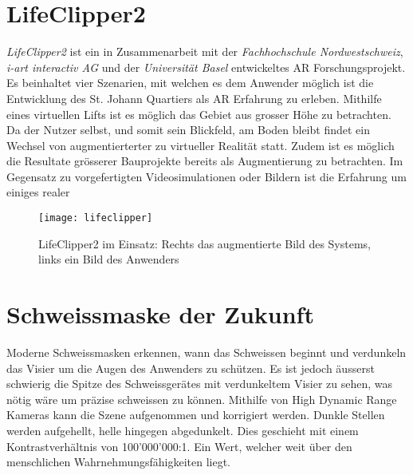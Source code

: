 \section{LifeClipper2}\label{s.clipper}
\textit{LifeClipper2} ist ein in Zusammenarbeit mit der \textit{Fachhochschule Nordwestschweiz}, \textit{i-art interactiv AG} und der \textit{Universität Basel} entwickeltes AR Forschungsprojekt. Es beinhaltet vier Szenarien, mit welchen es dem Anwender möglich ist die Entwicklung des St. Johann Quartiers als AR Erfahrung zu erleben. Mithilfe eines virtuellen Lifts ist es möglich das Gebiet aus grosser Höhe zu betrachten. Da der Nutzer selbst, und somit sein Blickfeld, am Boden bleibt findet ein Wechsel von augmentierterter zu virtueller Realität statt. Zudem ist es möglich die Resultate grösserer Bauprojekte bereits als Augmentierung zu betrachten. Im Gegensatz zu vorgefertigten Videosimulationen oder Bildern ist die Erfahrung um einiges realer \cite[S.~172~ff.]{website:lifeclipper}\\[6pt]

\begin{figure}[ht]
	\vspace{-15pt}
	\begin{center}
		\texttt{[image: lifeclipper]}
	\end{center}
	\vspace{-15pt}
	\caption[LifeClipper2 im Einsatz]{LifeClipper2 im Einsatz: Rechts das augmentierte Bild des Systems, links ein Bild des Anwenders}\label{lifeclipper}
	\vspace{-10pt}
\end{figure}


\section{Schweissmaske der Zukunft}\label{s.welding}
Moderne Schweissmasken erkennen, wann das Schweissen beginnt und verdunkeln das Visier um die Augen des Anwenders zu schützen. Es ist jedoch äusserst schwierig die Spitze des Schweissgerätes mit verdunkeltem Visier zu sehen, was nötig wäre um präzise schweissen zu können. Mithilfe von High Dynamic Range Kameras kann die Szene aufgenommen und korrigiert werden. Dunkle Stellen werden aufgehellt, helle hingegen abgedunkelt. Dies geschieht mit einem Kontrastverhältnis von 100'000'000:1. Ein Wert, welcher weit über den menschlichen Wahrnehmungsfähigkeiten liegt.\\[6pt]

